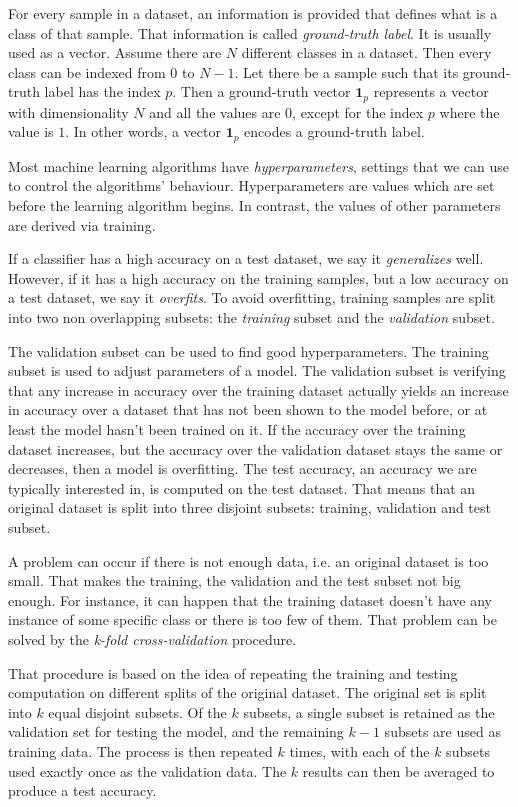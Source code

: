 For every sample in a dataset, an information is provided that defines what is a class of that sample. That information is called \textit{ground-truth label}. It is usually used as a vector. Assume there are $N$ different classes in a dataset. Then every class can be indexed from $0$ to $N-1$. Let there be a sample such that its ground-truth label has the index $p$. Then a ground-truth vector $\pmb 1_p$ represents a vector with dimensionality $N$ and all the values are $0$, except for the index $p$ where the value is $1$. In other words, a vector $\pmb 1_p$ encodes a ground-truth label.

Most machine learning algorithms have \textit{hyperparameters}, settings that we can use to control the algorithms' behaviour. Hyperparameters are values which are set before the learning algorithm begins. In contrast, the values of other parameters are derived via training. 

If a classifier has a high accuracy on a test dataset, we say it \textit{generalizes} well. However, if it has a high accuracy on the training samples, but a low accuracy on a test dataset, we say it \textit{overfits}. To avoid overfitting, training samples are split into two non overlapping subsets: the \textit{training} subset and the \textit{validation} subset.

The validation subset can be used to find good hyperparameters. The training subset is used to adjust parameters of a model. The validation subset is verifying that any increase in accuracy over the training dataset actually yields an increase in accuracy over a dataset that has not been shown to the model before, or at least the model hasn't been trained on it. If the accuracy over the training dataset increases, but the accuracy over the validation dataset stays the same or decreases, then a model is overfitting. The test accuracy, an accuracy we are typically interested in, is computed on the test dataset. That means that an original dataset is split into three disjoint subsets: training, validation and test subset. 

A problem can occur if there is not enough data, i.e. an original dataset is too small. That makes the training, the validation and the test subset not big enough. For instance, it can happen that the training dataset doesn't have any instance of some specific class or there is too few of them. That problem can be solved by the \textit{k-fold cross-validation} procedure.

That procedure is based on the idea of repeating the training and testing computation on different splits of the original dataset. The original set is split into $k$ equal disjoint subsets. Of the $k$ subsets, a single subset is retained as the validation set for testing the model, and the remaining $k-1$ subsets are used as training data. The process is then repeated $k$ times, with each of the $k$ subsets used exactly once as the validation data. The $k$ results can then be averaged to produce a test accuracy. 

